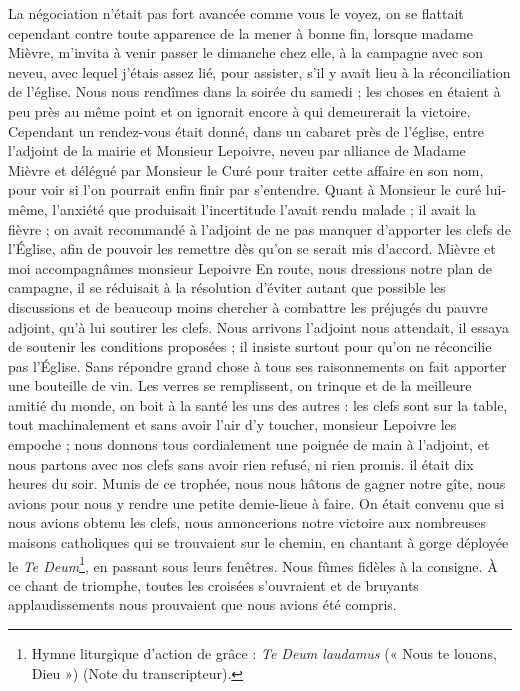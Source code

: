 \documentclass[11pt,a4paper]{report}
\begin{document}
La négociation n'était pas fort avancée comme vous le voyez, on se flattait cependant contre toute apparence de la mener à bonne fin, lorsque madame Mièvre, m'invita à venir passer le dimanche chez elle, à la campagne avec son neveu, avec lequel j'étais assez lié, pour assister, s'il y avait lieu à la réconciliation de l'église. Nous nous rendîmes dans la soirée du samedi ; les choses en étaient à peu près au même point et on ignorait encore à qui demeurerait la victoire. Cependant un rendez-vous était donné, dans un cabaret près de l'église, entre l'adjoint de la mairie et Monsieur Lepoivre, neveu par alliance de Madame Mièvre et délégué par Monsieur le Curé pour traiter cette affaire en son nom, pour voir si l'on pourrait enfin finir par s'entendre. Quant à Monsieur le curé lui-même, l'anxiété que produisait l'incertitude l'avait rendu malade ; il avait la fièvre ; on avait recommandé à l'adjoint de ne pas manquer d'apporter les clefs de l'Église, afin de pouvoir les remettre dès qu'on se serait mis d'accord. Mièvre et moi accompagnâmes monsieur Lepoivre En route, nous dressions notre plan de campagne, il se réduisait à la résolution d'éviter autant que possible les discussions et de beaucoup moins chercher à combattre les préjugés du pauvre adjoint, qu'à lui soutirer les clefs. Nous arrivons l'adjoint nous attendait, il essaya de soutenir les conditions proposées ; il insiste surtout pour qu'on ne réconcilie pas l'Église. Sans répondre grand chose à tous ses raisonnements on fait apporter une bouteille de vin. Les verres se remplissent, on trinque et de la meilleure amitié du monde, on boit à la santé les uns des autres : les clefs sont sur la table, tout machinalement et sans avoir l'air d'y toucher, monsieur Lepoivre les empoche ; nous donnons tous cordialement une poignée de main à l'adjoint, et nous partons avec nos clefs sans avoir rien refusé, ni rien promis. il était dix heures du soir. Munis de ce trophée, nous nous hâtons de gagner notre gîte, nous avions pour nous y rendre une petite demie-lieue à faire. On était convenu que si nous avions obtenu les clefs, nous annoncerions notre victoire aux nombreuses maisons catholiques qui se trouvaient sur le chemin, en chantant à gorge déployée le \textit{Te Deum}\footnote{Hymne liturgique d'action de grâce : \textit{Te Deum laudamus} (« Nous te louons, Dieu ») (Note du transcripteur).}, en passant sous leurs fenêtres. Nous fûmes fidèles à la consigne. À ce chant de triomphe, toutes les croisées s'ouvraient et de bruyants applaudissements nous prouvaient que nous avions été compris.
\end{document}
